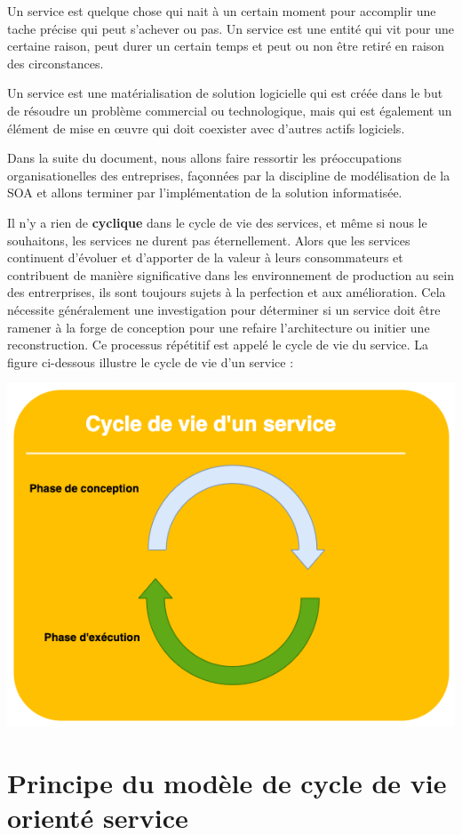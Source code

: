 \documentclass[
]{book}
\theoremstyle{definition}
\theoremstyle{definition}
\theoremstyle{definition}
\theoremstyle{definition}
\theoremstyle{remark}
\begin{document}
Un service est quelque chose qui nait à un certain moment pour accomplir une tache précise qui peut s'achever ou pas. Un service est une entité qui vit pour une certaine raison, peut durer un certain temps et peut ou non être retiré en raison des circonstances.

Un service est une matérialisation de solution logicielle qui est créée dans le but de résoudre un problème commercial ou technologique, mais qui est également un élément de mise en œuvre qui doit coexister avec d'autres actifs logiciels.

Dans la suite du document, nous allons faire ressortir les préoccupations organisationelles des entreprises, façonnées par la discipline de modélisation de la SOA et allons terminer par l'implémentation de la solution informatisée.

Il n'y a rien de \textbf{cyclique} dans le cycle de vie des services, et même si nous le souhaitons, les services ne durent pas éternellement. Alors que les services continuent d'évoluer et d'apporter de la valeur à leurs consommateurs et contribuent de manière significative dans les environnement de production au sein des entrerprises, ils sont toujours sujets à la perfection et aux amélioration. Cela nécessite généralement une investigation pour déterminer si un service doit être ramener à la forge de conception pour une refaire l'architecture ou initier une reconstruction. Ce processus répétitif est appelé le cycle de vie du service.
La figure ci-dessous illustre le cycle de vie d'un service :

\begin{center}\includegraphics[width=0.7\linewidth]{cyclevie} \end{center}

\hypertarget{principe-du-moduxe8le-de-cycle-de-vie-orientuxe9-service}{%
\section{Principe du modèle de cycle de vie orienté service}\label{principe-du-moduxe8le-de-cycle-de-vie-orientuxe9-service}}
\end{document}
